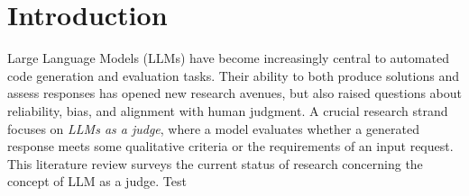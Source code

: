\section{Introduction}
Large Language Models (LLMs) have become increasingly central to automated code generation and evaluation tasks. Their ability to both produce solutions and assess responses has opened new research avenues, but also raised questions about reliability, bias, and alignment with human judgment. A crucial research strand focuses on \textit{LLMs as a judge}, where a model evaluates whether a generated response meets some qualitative criteria or the requirements of an input request. This literature review surveys the current status of research concerning the concept of LLM as a judge. 
Test~\citet{li2024_llmsasjudges}




